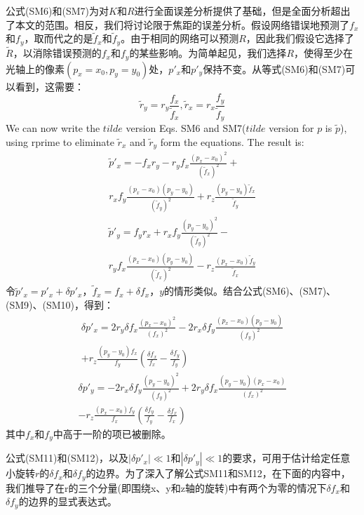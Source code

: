 \documentclass[10pt,journal,compsoc,UTF8]{IEEEtran}
\begin{document}
公式(SM6)和(SM7)为对$K$和$R$进行全面误差分析提供了基础，但是全面分析超出了本文的范围。相反，我们将讨论限于焦距的误差分析。假设网络错误地预测了$f_x$和$f_y$，取而代之的是$\tilde{f}_x$和$\tilde{f}_y$。由于相同的网络可以预测$R$，因此我们假设它选择了$\tilde{R}$，以消除错误预测的$f_x$和$f_y$的某些影响。为简单起见，我们选择$R$，使得至少在光轴上的像素$(p_x=x_0, p_y=y_0)$处，$p'_x$和$p'_y$保持不变。从等式(SM6)和(SM7)可以看到，这需要：
\begin{equation}
  \tilde{r}_y=r_y\frac{f_x}{\tilde{f}_x},\tilde{r}_x=r_x\frac{f_y}{\tilde{f}_y}
  \tag{SM8}
\end{equation}
We can now write the $tilde$ version Eqs. SM6 and SM7($tilde$ version for $p$ is $\tilde{p}$), using rprime to eliminate $\tilde{r}_x$ and $\tilde{r}_y$ form the equations. The result is:
\begin{multline}
  \tilde{p}'_x=-f_xr_y-r_yf_x\frac{(p_x-x_0)^2}{(\tilde{f}_x)^2}+\\
  r_xf_y\frac{(p_x-x_0)(p_y-y_0)}{(\tilde{f}_y)^2}+r_z\frac{(p_y-y_0)\tilde{f}_x}{\tilde{f}_y}
  \tag{SM9}
\end{multline}
\begin{multline}
  \tilde{p}'_y=f_yr_x+r_xf_y\frac{(p_y-y_0)^2}{(\tilde{f}_y)^2}-\\
  r_yf_x\frac{(p_x-x_0)(p_y-y_0)}{(\tilde{f}_x)^2}-r_z\frac{(p_x-x_0)\tilde{f}_y}{\tilde{f}_x}
  \tag{SM10}
\end{multline}
令$\tilde{p}'_x=p'_x+\delta p'_x$，$\tilde{f}_x=f_x+\delta f_x$，$y$的情形类似。结合公式(SM6)、(SM7)、(SM9)、(SM10)，得到：
\begin{multline}
  \delta p'_x =2r_y\delta f_x\frac{(p_x-x_0)^2}{(f_x)^2}
  -2r_x\delta f_y\frac{(p_x-x_0)(p_y-y_0)}{(f_y)^2}\\
  +r_z\frac{(p_y-y_0)f_x}{f_y}\left(\frac{\delta f_x}{f_x}-\frac{\delta f_y}{f_y}\right)
  \tag{SM11}
\end{multline}
\begin{multline}
  \delta p'_y =-2r_x\delta f_y\frac{(p_y-y_0)^2}{(f_y)^2}
  +2r_y\delta f_x\frac{(p_y-y_0)(p_x-x_0)}{(f_x)^2}\\
  -r_z\frac{(p_x-x_0)f_y}{f_x}\left(\frac{\delta f_y}{f_y}-\frac{\delta f_x}{f_x}\right)
  \tag{SM12}
\end{multline}
其中$f_x$和$f_y$中高于一阶的项已被删除。

公式(SM11)和(SM12)，以及$|\delta p'_x|\ll 1$和$|\delta p'_y|\ll 1$的要求，可用于估计给定任意小旋转$r$的$\delta f_x$和$\delta f_y$的边界。为了深入了解公式SM11和SM12，在下面的内容中，我们推导了在r的三个分量(即围绕x、y和z轴的旋转)中有两个为零的情况下$\delta f_x$和$\delta f_y$的边界的显式表达式。
\end{document}
